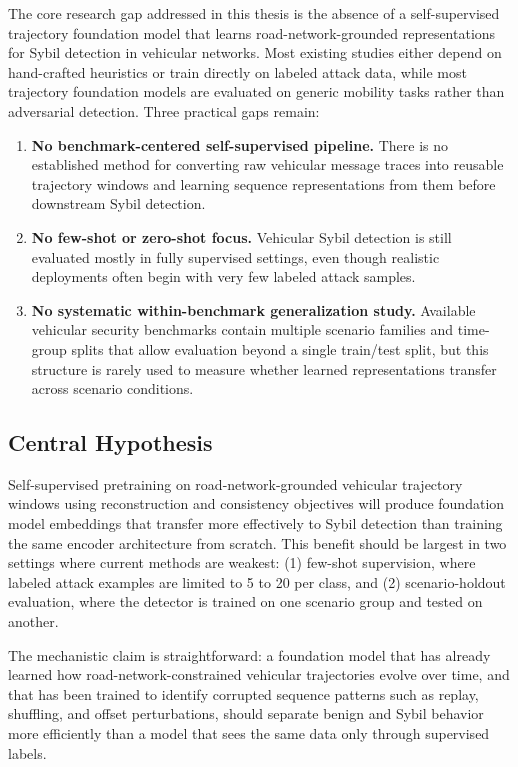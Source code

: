 \documentclass[12pt]{article}
\begin{document}
The core research gap addressed in this thesis is the absence of a self-supervised trajectory foundation model that learns road-network-grounded representations for Sybil detection in vehicular networks. Most existing studies either depend on hand-crafted heuristics or train directly on labeled attack data, while most trajectory foundation models are evaluated on generic mobility tasks rather than adversarial detection. Three practical gaps remain:

\begin{enumerate}
    \item \textbf{No benchmark-centered self-supervised pipeline.} There is no established method for converting raw vehicular message traces into reusable trajectory windows and learning sequence representations from them before downstream Sybil detection.

    \item \textbf{No few-shot or zero-shot focus.} Vehicular Sybil detection is still evaluated mostly in fully supervised settings, even though realistic deployments often begin with very few labeled attack samples.

    \item \textbf{No systematic within-benchmark generalization study.} Available vehicular security benchmarks contain multiple scenario families and time-group splits that allow evaluation beyond a single train/test split, but this structure is rarely used to measure whether learned representations transfer across scenario conditions.
\end{enumerate}

\subsection{Central Hypothesis}

Self-supervised pretraining on road-network-grounded vehicular trajectory windows using reconstruction and consistency objectives will produce foundation model embeddings that transfer more effectively to Sybil detection than training the same encoder architecture from scratch. This benefit should be largest in two settings where current methods are weakest: (1) few-shot supervision, where labeled attack examples are limited to 5 to 20 per class, and (2) scenario-holdout evaluation, where the detector is trained on one scenario group and tested on another.

The mechanistic claim is straightforward: a foundation model that has already learned how road-network-constrained vehicular trajectories evolve over time, and that has been trained to identify corrupted sequence patterns such as replay, shuffling, and offset perturbations, should separate benign and Sybil behavior more efficiently than a model that sees the same data only through supervised labels.
\end{document}
